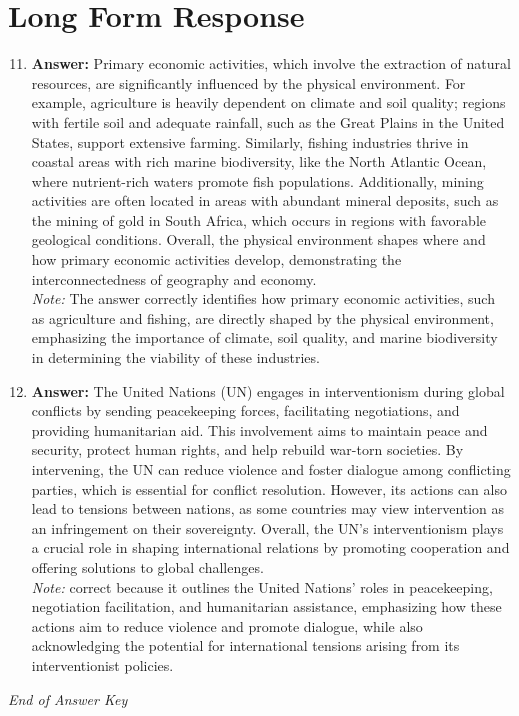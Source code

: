 \documentclass[12pt]{article}
\begin{document}
\section*{Long Form Response}
\begin{enumerate}[label=\arabic*.]
\setcounter{enumi}{10}
\item \textbf{Answer:} Primary economic activities, which involve the extraction of natural resources, are significantly influenced by the physical environment. For example, agriculture is heavily dependent on climate and soil quality; regions with fertile soil and adequate rainfall, such as the Great Plains in the United States, support extensive farming. Similarly, fishing industries thrive in coastal areas with rich marine biodiversity, like the North Atlantic Ocean, where nutrient-rich waters promote fish populations. Additionally, mining activities are often located in areas with abundant mineral deposits, such as the mining of gold in South Africa, which occurs in regions with favorable geological conditions. Overall, the physical environment shapes where and how primary economic activities develop, demonstrating the interconnectedness of geography and economy.
\\ \textit{Note:} The answer correctly identifies how primary economic activities, such as agriculture and fishing, are directly shaped by the physical environment, emphasizing the importance of climate, soil quality, and marine biodiversity in determining the viability of these industries.
\item \textbf{Answer:} The United Nations (UN) engages in interventionism during global conflicts by sending peacekeeping forces, facilitating negotiations, and providing humanitarian aid. This involvement aims to maintain peace and security, protect human rights, and help rebuild war-torn societies. By intervening, the UN can reduce violence and foster dialogue among conflicting parties, which is essential for conflict resolution. However, its actions can also lead to tensions between nations, as some countries may view intervention as an infringement on their sovereignty. Overall, the UN's interventionism plays a crucial role in shaping international relations by promoting cooperation and offering solutions to global challenges.
\\ \textit{Note:} correct because it outlines the United Nations' roles in peacekeeping, negotiation facilitation, and humanitarian assistance, emphasizing how these actions aim to reduce violence and promote dialogue, while also acknowledging the potential for international tensions arising from its interventionist policies.
\end{enumerate}

\vfill
\noindent\textit{End of Answer Key}
\end{document}
